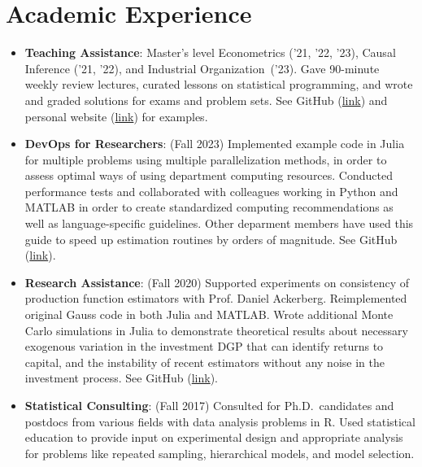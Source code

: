 \documentclass[a4paper,20pt]{article}
\newcommand{\resumeItem}[2]{
  \item\small{
    \textbf{#1}{: #2 \vspace{-2pt}}
  }
}
\newcommand{\resumeSubItem}[2]{\resumeItem{#1}{#2}\vspace{-3pt}}
\newcommand{\resumeSubHeadingListEnd}{\end{itemize}}
\begin{document}
\begin{itemize}[leftmargin=*, itemindent=-9em]
\resumeSubHeadingListEnd

\vspace{-5pt}\section{Academic Experience}
\begin{itemize}[leftmargin=*, itemindent=-12pt]
  \resumeSubItem{Teaching Assistance}{Master's level Econometrics ('21, '22, '23), Causal Inference ('21, '22), and Industrial Organization~('23). Gave 90-minute weekly review lectures, curated lessons on statistical programming, and wrote and graded solutions for exams and problem sets. See GitHub (\href{https://github.com/nateybear/causal-inference-2022}{link}) and personal website (\href{https://pages.nghattersley.net/metrics-in-r}{link}) for examples.}
\resumeSubItem{DevOps for Researchers}{(Fall 2023) Implemented example code in Julia for multiple problems using multiple parallelization methods, in order to assess optimal ways of using department computing resources. Conducted performance tests and collaborated with colleagues working in Python and MATLAB in order to create standardized computing recommendations as well as language-specific guidelines. Other deparment members have used this guide to speed up estimation routines by orders of magnitude. See GitHub (\href{https://github.com/nateybear/parallel-racers/wiki}{link}).}
\resumeSubItem{Research Assistance}{(Fall 2020) Supported experiments on consistency of production function estimators with Prof. Daniel Ackerberg. Reimplemented original Gauss code in both Julia and MATLAB. Wrote additional Monte Carlo simulations in Julia to demonstrate theoretical results about necessary exogenous variation in the investment DGP that can identify returns to capital, and the instability of recent estimators without any noise in the investment process. See GitHub (\href{https://github.com/nateybear/production-functions.jl}{link}).}
\vspace{2pt}
\resumeSubItem{Statistical Consulting}{(Fall 2017) Consulted for Ph.D.\ candidates and postdocs from various fields with data analysis problems in R. Used statistical education to provide input on experimental design and appropriate analysis for problems like repeated sampling, hierarchical models, and model selection.}
\resumeSubHeadingListEnd
\vspace{-5pt}
\end{document}
